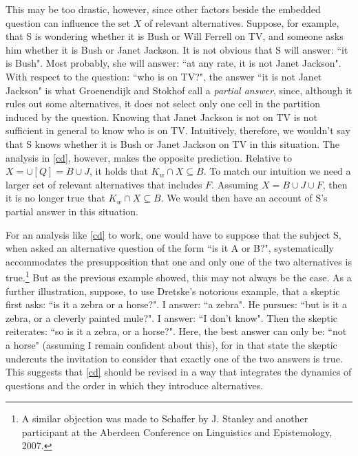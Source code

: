 This may be too drastic, however, since other factors beside the embedded question can influence the set  $X$ of   relevant alternatives. 
Suppose, for example, that S is wondering whether it is Bush or Will Ferrell on TV, and someone asks him
whether it is Bush or Janet Jackson.  It is not obvious that S will
answer: ``it is Bush". Most probably, she will answer: ``at any rate, it is not Janet Jackson".   With respect to the question: ``who is on TV?", the
answer ``it is not Janet Jackson" is what Groenendijk and Stokhof
call a \emph{partial answer}, since,  although it rules out some alternatives, it does not select only one cell in
the partition induced by the question. Knowing that Janet
Jackson is not on TV is not sufficient in general to know who is
on TV.
Intuitively, therefore, we wouldn't say that S knows whether it is Bush or Janet Jackson on TV in this situation. The analysis  in
\ref{cd},  however, makes the opposite prediction.  Relative to $X= \cup[Q] =B\cup  J$, it holds   that $K_w
\cap X \subseteq B$. To match our intuition we need a larger set 
of relevant alternatives that includes  $F$. Assuming $X=B\cup J\cup F$, then   it is no longer true that $K_w
\cap X \subseteq B$. We would then have an account of S's partial answer in this situation.

For an analysis like \ref{cd} to work, one would have to suppose
that the subject S, when asked an alternative question of the form
``is it A or B?", systematically accommodates the presupposition
that one and only one of the two alternatives is true.\footnote{A
similar objection was made to Schaffer by J. Stanley and another
participant at the Aberdeen Conference on Linguistics and
Epistemology, 2007.} But as the previous example showed, this may not always be the case. As a further illustration, suppose,
to use Dretske's notorious example, that a skeptic first asks:
``is it a zebra or a horse?". I answer: ``a zebra". He pursues:
``but is it a zebra, or a cleverly painted mule?". I answer: ``I
don't know". Then the skeptic reiterates: ``so is it a zebra, or a
horse?". Here, the best answer can only be: ``not a horse" 
(assuming I remain confident about this), for in that state the
skeptic undercuts the invitation to consider that exactly one of
the two answers is true. This suggests that \ref{cd} should be
revised in a way that integrates the dynamics of questions and the
order in which they introduce alternatives.
 

 



